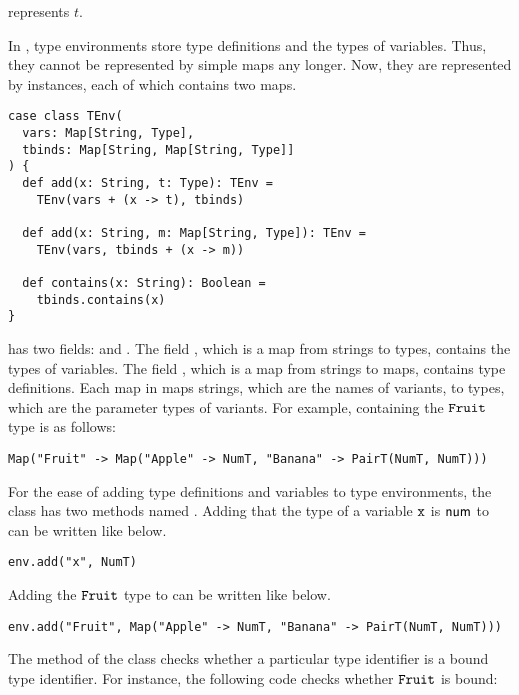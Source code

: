  represents $t$.

In \lang, type environments store type definitions and the types of variables.
Thus, they cannot be represented by simple maps any longer. Now, they are
represented by  instances, each of which contains two maps.

\begin{verbatim}
case class TEnv(
  vars: Map[String, Type],
  tbinds: Map[String, Map[String, Type]]
) {
  def add(x: String, t: Type): TEnv =
    TEnv(vars + (x -> t), tbinds)

  def add(x: String, m: Map[String, Type]): TEnv =
    TEnv(vars, tbinds + (x -> m))

  def contains(x: String): Boolean =
    tbinds.contains(x)
}
\end{verbatim}

 has two fields:  and .
The field , which is a map from strings to \lang types, contains
the types of variables. The field , which is a map from strings to
maps, contains type definitions. Each map in  maps strings, which
are the names of variants, to \lang types, which are the parameter types
of variants. For example,  containing the $\texttt{Fruit}$ type is
as follows:

\begin{verbatim}
Map("Fruit" -> Map("Apple" -> NumT, "Banana" -> PairT(NumT, NumT)))
\end{verbatim}

For the ease of adding type definitions and variables to type environments, the 
class has two methods named . Adding that the type of a variable $\texttt{x}$ is
$\textsf{num}$ to  can be written like below.

\begin{verbatim}
env.add("x", NumT)
\end{verbatim}

Adding the $\texttt{Fruit}$ type to  can be written like below.

\begin{verbatim}
env.add("Fruit", Map("Apple" -> NumT, "Banana" -> PairT(NumT, NumT)))
\end{verbatim}

The  method of the  class checks whether a particular
type identifier is a bound type identifier. For instance,
the following code checks whether $\texttt{Fruit}$ is bound:

